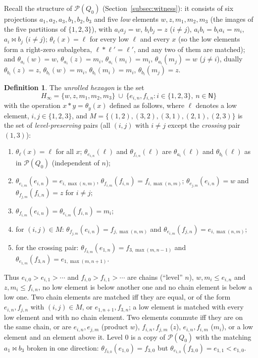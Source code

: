 \documentclass[11pt]{amsart}
\theoremstyle{definition}
\newtheorem{definition}[theorem]{Definition}
\renewcommand{\P}{\mathcal{P}}
\newcommand{\N}{\mathsf{N}}
\newcommand{\mt}{\bowtie}   %
\begin{document}
Recall the structure of $\P(Q_0)$ (Section~\ref{subsec:witness}): it consists of six projections $a_1,a_2,a_3,b_1,b_2,b_3$ and five \emph{low} elements $w,z,m_1,m_2,m_3$ (the images of the five partitions of $\{1,2,3\}$), with $a_ia_j=w$, $b_ib_j=z$ ($i\ne j$), $a_ib_i=b_ia_i=m_i$, $a_i\mt b_j$ ($i\ne j$); $\theta_\ell(x)=\ell$ for every low $\ell$ and every $x$ (so the low elements form a right-zero subalgebra, $\ell*\ell'=\ell'$, and any two of them are matched); and $\theta_{a_i}(w)=w$, $\theta_{a_i}(z)=m_i$, $\theta_{a_i}(m_i)=m_i$, $\theta_{a_i}(m_j)=w$ ($j\ne i$), dually $\theta_{b_i}(z)=z$, $\theta_{b_i}(w)=m_i$, $\theta_{b_i}(m_i)=m_i$, $\theta_{b_i}(m_j)=z$.

\begin{definition}\label{def:hinf}
The \emph{unrolled hexagon} is the set
\[
H_\infty=\{w,z,m_1,m_2,m_3\}\ \cup\ \{e_{i,n},f_{i,n}: i\in\{1,2,3\},\ n\in\N\}
\]
with the operation $x*y=\theta_y(x)$ defined as follows, where $\ell$ denotes a low element, $i,j\in\{1,2,3\}$, and $M=\{(1,2),(3,2),(3,1),(2,1),(2,3)\}$ is the set of \emph{level-preserving} pairs (all $(i,j)$ with $i\ne j$ except the \emph{crossing} pair $(1,3)$):
\begin{enumerate}[label=\textup{(\roman*)},nosep]
\item $\theta_\ell(x)=\ell$ for all $x$; $\theta_{e_{i,n}}(\ell)$ and $\theta_{f_{i,n}}(\ell)$ are $\theta_{a_i}(\ell)$ and $\theta_{b_i}(\ell)$ as in $\P(Q_0)$ (independent of $n$);
\item $\theta_{e_{i,m}}(e_{i,n})=e_{i,\max(n,m)}$, $\theta_{f_{i,m}}(f_{i,n})=f_{i,\max(n,m)}$; $\theta_{e_{j,m}}(e_{i,n})=w$ and $\theta_{f_{j,m}}(f_{i,n})=z$ for $i\ne j$;
\item $\theta_{f_{i,m}}(e_{i,n})=\theta_{e_{i,m}}(f_{i,n})=m_i$;
\item for $(i,j)\in M$: $\theta_{f_{j,m}}(e_{i,n})=f_{j,\max(n,m)}$ and $\theta_{e_{i,m}}(f_{j,n})=e_{i,\max(n,m)}$;
\item for the crossing pair: $\theta_{f_{3,m}}(e_{1,n})=f_{3,\max(m,n-1)}$ and $\theta_{e_{1,m}}(f_{3,n})=e_{1,\max(m,n+1)}$.
\end{enumerate}
\end{definition}

Thus $e_{i,0}>e_{i,1}>\cdots$ and $f_{i,0}>f_{i,1}>\cdots$ are chains (``level'' $n$), $w,m_i\le e_{i,n}$ and $z,m_i\le f_{i,n}$, no low element is below another one and no chain element is below a low one. Two chain elements are matched iff they are equal, or of the form $e_{i,n},f_{j,n}$ with $(i,j)\in M$, or $e_{1,n+1},f_{3,n}$; a low element is matched with every low element and with no chain element. Two elements commute iff they are on the same chain, or are $e_{i,n},e_{j,m}$ (product $w$), $f_{i,n},f_{j,m}$ ($z$), $e_{i,n},f_{i,m}$ ($m_i$), or a low element and an element above it. Level $0$ is a copy of $\P(Q_0)$ with the matching $a_1\mt b_3$ broken in one direction: $\theta_{f_{3,0}}(e_{1,0})=f_{3,0}$ but $\theta_{e_{1,0}}(f_{3,0})=e_{1,1}<e_{1,0}$.
\end{document}
